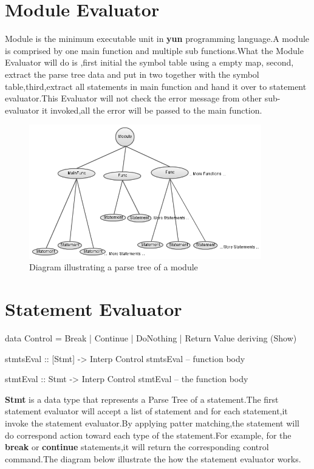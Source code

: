 \section{Module Evaluator}
Module is the minimum executable unit in \textbf{yun} programming language.A module is comprised by one main function and multiple sub functions.What the Module Evaluator will do is ,first initial the symbol table using a empty map, second, extract the parse tree data and put in two together with the symbol table,third,extract all statements in main function and hand it over to statement evaluator.This Evaluator will not check the error message from other sub-evaluator it invoked,all the error will be passed to the main function.
\begin{figure}[H]
  \centering
	\includegraphics[width=0.90\textwidth]{pic/c6/module.png}
	\caption{Diagram illustrating a parse tree of a module}
\end{figure}
\section{Statement Evaluator}


\begin{hcode}
data Control = Break | Continue | DoNothing | Return Value deriving (Show)

stmtsEval :: [Stmt] -> Interp Control
stmtsEval --   function body

stmtEval :: Stmt -> Interp Control
stmtEval  -- the function body
\end{hcode}
\textbf{Stmt} is a data type that represents a Parse Tree of a statement.The first statement evaluator will accept a list of statement and for each statement,it invoke the statement evaluator.By applying patter matching,the statement will do correspond action toward each type of the statement.For example, for the \textbf{break} or \textbf{continue} statements,it will return the corresponding control command.The diagram below illustrate the how the statement evaluator works.


